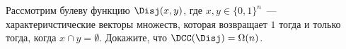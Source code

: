 Рассмотрим булеву функцию $\Disj(x, y)$, где $x, y \in \{0, 1\}^n$~--- характеричстические векторы
множеств, которая возвращает $1$ тогда и только тогда, когда $x \cap y = \emptyset$. Докажите, что
$\DCC(\Disj) = \Omega(n)$.